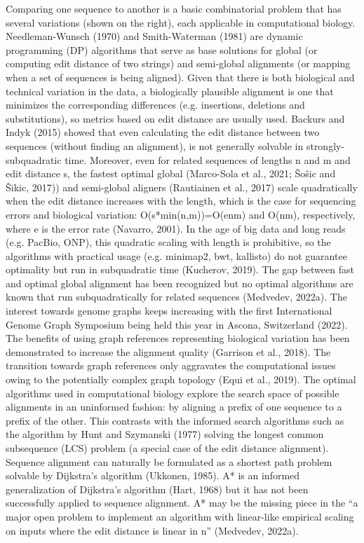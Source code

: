 Comparing one sequence to another is a basic combinatorial problem that has
several variations (shown on the right), each applicable in computational
biology. Needleman-Wunsch (1970)  and Smith-Waterman (1981) are dynamic
programming (DP) algorithms that serve as base solutions for global (or
computing edit distance of two strings) and semi-global alignments (or mapping
when a set of sequences is being aligned). Given that there is both biological
and technical variation in the data, a biologically plausible alignment is one
that minimizes the corresponding differences (e.g. insertions, deletions and
substitutions), so metrics based on edit distance are usually used. Backurs and
Indyk (2015) showed that even calculating the edit distance between two
sequences (without finding an alignment), is not generally solvable in
strongly-subquadratic time. Moreover, even for related sequences of lengths n
and m and edit distance s, the fastest optimal global (Marco-Sola et al., 2021;
Šošic and Šikic, 2017)) and semi-global aligners (Rautiainen et al., 2017) scale
quadratically when the edit distance increases with the length, which is the
case for sequencing errors and biological variation: O(s*min(n,m))=O(enm) and
O(nm), respectively, where e is the error rate (Navarro, 2001). In the age of
big data and long reads (e.g. PacBio, ONP), this quadratic scaling with length
is prohibitive, so the algorithms with practical usage (e.g. minimap2, bwt,
kallisto) do not guarantee optimality but run in subquadratic time (Kucherov,
2019). The gap between fast and optimal global alignment has been recognized but
no optimal algorithms are known that run subquadratically for related sequences
(Medvedev, 2022a). The interest towards genome graphs keeps increasing with the
first International Genome Graph Symposium being held this year in Ascona,
Switzerland (2022). The benefits of using graph references representing
biological variation has been demonstrated to increase the alignment quality
(Garrison et al., 2018). The transition towards graph references only aggravates
the computational issues owing to the potentially complex graph topology (Equi
et al., 2019). The optimal algorithms used in computational biology explore the
search space of possible alignments in an uninformed fashion: by aligning a
prefix of one sequence to a prefix of the other. This contrasts with the
informed search algorithms such as the algorithm by Hunt and Szymanski (1977)
solving the longest common subsequence (LCS) problem (a special case of the edit
distance alignment). Sequence alignment can naturally be formulated as a
shortest path problem solvable by Dijkstra’s algorithm (Ukkonen, 1985). A* is an
informed generalization of Dijkstra’s algorithm (Hart, 1968) but it has not been
successfully applied to sequence alignment. A* may be the missing piece in the
“a major open problem to implement an algorithm with linear-like empirical
scaling on inputs where the edit distance is linear in n” (Medvedev, 2022a).







